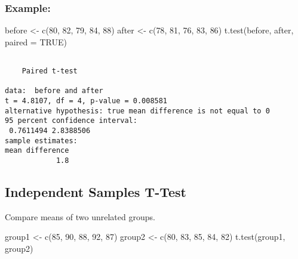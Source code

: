 \documentclass[
  letterpaper,
  DIV=11,
  numbers=noendperiod]{scrreprt}
\newenvironment{Shaded}{\begin{snugshade}}{\end{snugshade}}
\newcommand{\AttributeTok}[1]{\textcolor[rgb]{0.40,0.45,0.13}{#1}}
\newcommand{\ConstantTok}[1]{\textcolor[rgb]{0.56,0.35,0.01}{#1}}
\newcommand{\DecValTok}[1]{\textcolor[rgb]{0.68,0.00,0.00}{#1}}
\newcommand{\FunctionTok}[1]{\textcolor[rgb]{0.28,0.35,0.67}{#1}}
\newcommand{\NormalTok}[1]{\textcolor[rgb]{0.00,0.23,0.31}{#1}}
\newcommand{\OtherTok}[1]{\textcolor[rgb]{0.00,0.23,0.31}{#1}}
\begin{document}
\subsubsection{Example:}\label{example-10}

\begin{Shaded}
\begin{Highlighting}[]
\NormalTok{before }\OtherTok{\textless{}{-}} \FunctionTok{c}\NormalTok{(}\DecValTok{80}\NormalTok{, }\DecValTok{82}\NormalTok{, }\DecValTok{79}\NormalTok{, }\DecValTok{84}\NormalTok{, }\DecValTok{88}\NormalTok{)}
\NormalTok{after }\OtherTok{\textless{}{-}} \FunctionTok{c}\NormalTok{(}\DecValTok{78}\NormalTok{, }\DecValTok{81}\NormalTok{, }\DecValTok{76}\NormalTok{, }\DecValTok{83}\NormalTok{, }\DecValTok{86}\NormalTok{)}
\FunctionTok{t.test}\NormalTok{(before, after, }\AttributeTok{paired =} \ConstantTok{TRUE}\NormalTok{)}
\end{Highlighting}
\end{Shaded}

\begin{verbatim}

    Paired t-test

data:  before and after
t = 4.8107, df = 4, p-value = 0.008581
alternative hypothesis: true mean difference is not equal to 0
95 percent confidence interval:
 0.7611494 2.8388506
sample estimates:
mean difference 
            1.8 
\end{verbatim}

\subsection{Independent Samples
T-Test}\label{independent-samples-t-test}

Compare means of two unrelated groups.

\begin{Shaded}
\begin{Highlighting}[]
\NormalTok{group1 }\OtherTok{\textless{}{-}} \FunctionTok{c}\NormalTok{(}\DecValTok{85}\NormalTok{, }\DecValTok{90}\NormalTok{, }\DecValTok{88}\NormalTok{, }\DecValTok{92}\NormalTok{, }\DecValTok{87}\NormalTok{)}
\NormalTok{group2 }\OtherTok{\textless{}{-}} \FunctionTok{c}\NormalTok{(}\DecValTok{80}\NormalTok{, }\DecValTok{83}\NormalTok{, }\DecValTok{85}\NormalTok{, }\DecValTok{84}\NormalTok{, }\DecValTok{82}\NormalTok{)}
\FunctionTok{t.test}\NormalTok{(group1, group2)}
\end{Highlighting}
\end{Shaded}
\end{document}

